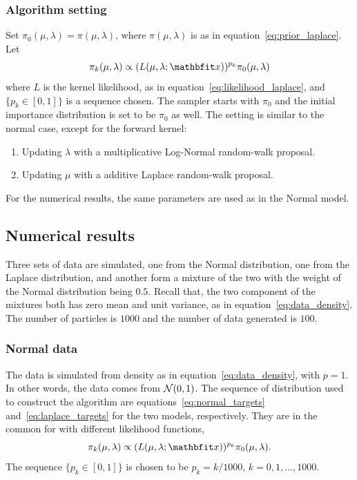 \subsubsection{Algorithm setting}

Set $\pi_0(\mu,\lambda) = \pi(\mu,\lambda)$, where $\pi(\mu,\lambda)$ is as
in equation~\ref{eq:prior_laplace}. Let
\begin{equation}
  \pi_k(\mu,\lambda) \propto (L(\mu,\lambda;\x))^{p_k}\pi_0(\mu,\lambda)
  \label{eq:laplace_targets}
\end{equation}
where $L$ is the kernel likelihood, as in
equation~\eqref{eq:likelihood_laplace}, and $\{p_k\in[0,1]\}$ is a sequence
chosen. The \smc sampler starts with $\pi_0$ and the initial importance
distribution is set to be $\pi_0$ as well. The setting is similar to the
normal case, except for the forward kernel:
\begin{enumerate}
  \item Updating $\lambda$ with a multiplicative Log-Normal random-walk
    proposal.
  \item Updating $\mu$ with a additive Laplace random-walk proposal.
\end{enumerate}

\begin{remark}
  For the numerical results, the same parameters are used as in the Normal
  model.
\end{remark}

\subsection{Numerical results}
\label{sub:Numerical results}

Three sets of data are simulated, one from the Normal distribution, one from
the Laplace distribution, and another form a mixture of the two with the
weight of the Normal distribution being $0.5$. Recall that, the two
component of the mixtures both has zero mean and unit variance, as in
equation~\eqref{eq:data_density}. The number of particles is $1000$ and the
number of data generated is $100$.

\subsubsection{Normal data}

The data is simulated from density as in equation~\eqref{eq:data_density},
with $p = 1$. In other words, the data comes from $\mathcal{N}(0,1)$. The sequence
of distribution used to construct the \smc algorithm are
equations~\eqref{eq:normal_targets} and~\eqref{eq:laplace_targets} for the
two models, respectively. They are in the common for with different
likelihood functions,
\begin{equation*}
  \pi_k(\mu,\lambda) \propto (L(\mu,\lambda;\x))^{p_k}\pi_0(\mu,\lambda).
\end{equation*}
The sequence $\{p_k\in[0,1]\}$ is chosen to be $p_k = k / 1000$, $k = 0, 1,
\dots, 1000$.

